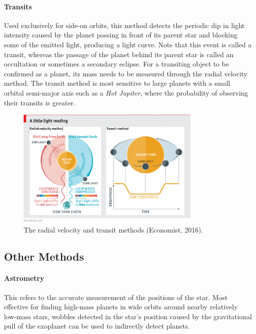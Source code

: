 \documentclass[11pt]{article}
\begin{document}
\hypertarget{transits}{%
\paragraph{Transits}\label{transits}}

Used exclusively for side-on orbits, this method detects the periodic
dip in light intensity caused by the planet passing in front of its
parent star and blocking some of the emitted light, producing a light
curve. Note that this event is called a transit, whereas the passage of
the planet behind its parent star is called an occultation or sometimes
a secondary eclipse. For a transiting object to be confirmed as a
planet, its mass needs to be measured through the radial velocity
method. The transit method is most sensitive to large planets with a
small orbital semi-major axis such as a \emph{Hot Jupiter}, where the
probability of observing their transits is greater.

\quad
\begin{figure}[!ht]
	\centering
	\includegraphics[width=0.8\textwidth]{../images/methods.png}
	\caption{The radial velocity and transit methods (Economist, 2016).} \label{Figure 1.a}
\end{figure}


\hypertarget{other-methods}{%
\subsection{Other Methods}\label{other-methods}}

\hypertarget{astrometry}{%
\paragraph{Astrometry}\label{astrometry}}

This refers to the accurate measurement of the positions of the star.
Most effective for finding high-mass planets in wide orbits around
nearby relatively low-mass stars, wobbles detected in the star's
position caused by the gravitational pull of the exoplanet can be used
to indirectly detect planets.
\end{document}
